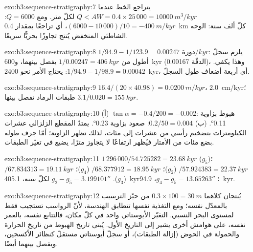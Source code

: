 \begin{solution}{exo:b3:sequence-stratigraphy:7}
يتراجع الخط عندما $Q < AW = 0.4\times25\,000 = \qty{10000}{m^3/kyr}$ لكلّ
متر. ومع $Q = 6000$: $(6000 - 10\,000)/10 = \qty{-400}{m/kyr}$، أي تراجعًا
بمقدار \qty{0.4}{km} كلّ ألف سنة: الوجه الشاطئي المنخفض يُنتج
تجاوزًا بحريًّا سريعًا.
\end{solution}

\begin{solution}{exo:b3:sequence-stratigraphy:8}
$1/94.9 - 1/123.9 = \num{0.00247}\text{ دورة}/\unit{kyr}$: يلزم سجلّ أطول من
$1/0.00247 = \qty{406}{kyr}$ يفصل بينهما، و\qty{600}{kyr} (الدقّة
0.00167)، وهذا يكفي. $1/94.9 - 1/98.9 = 0.00042$: يحتاج الأمر نحو
\qty{2400}{kyr}، أي أربعة أضعاف طول السجلّ.
\end{solution}

\begin{solution}{exo:b3:sequence-stratigraphy:9}
$16.4/(20\times40.98) = \qty{0.0200}{m/kyr}$، \qty{2.0}{cm/kyr}؛ طبقات الرماد
تفصل بينها $3.1/0.020 = \qty{155}{kyr}$.
\end{solution}

\begin{solution}{exo:b3:sequence-stratigraphy:10}
(أ) $\tan\alpha = -0.4/200 = -0.002$: هبوط بزاوية \ang{0.11}. (ب)
$0.2/50 = 0.004$: صعود بزاوية \ang{0.23}. يمتدّ المقطع الزلزالي عشرات
الكيلومترات بتضخيم رأسي من عشرات إلى مئات، لذلك تظهر الزاوية؛
أمّا جرف طوله بضع مئات من الأمتار فيُظهر ارتفاعًا لا يتجاوز مترًا، يضيع في
تغيّر الطبقات.
\end{solution}

\begin{solution}{exo:b3:sequence-stratigraphy:11}
$1\,296\,000/54.725282 = \qty{23.68}{kyr}$ ($g_5$)؛ $/57.924383 =
\qty{22.37}{kyr}$ ($g_2$)؛ $/68.377912 = \qty{18.95}{kyr}$ ($g_4$)؛
$/67.834313 = \qty{19.11}{kyr}$ ($g_3$). $g_2 - g_5 = 3.199101''$ لكلّ سنة،
\qty{405.1}{kyr}؛ $g_4 - g_5 = 13.65263''$، \qty{94.9}{kyr}.
\end{solution}

\begin{solution}{exo:b3:sequence-stratigraphy:12}
يُنتجان كلاهما $0.3\times100 = \qty{30}{m}$ من حيّز الترسيب بالمعدّل نفسه؛ ومع
التغذية نفسها تتطابق الهندسة، لأنّ الرواسب تستجيب فقط لمستوى
البحر النسبي. التغيّر الأيوستاتي واحد في كلّ مكان، فالتتابع
نفسه، بالعمر نفسه، على هوامش أخرى يشير إلى التاريخ الأول. يُبنى تاريخ الهبوط
من تاريخ الحرارة والحمولة في الحوض
(إزالة الطبقات)، أو سجلّ أيوستاتي مستقلّ كنظائر الأكسجين،
ويفصل بينهما أيضًا.
\end{solution}


